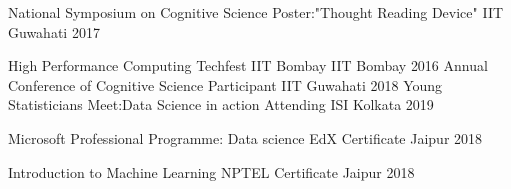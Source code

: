 
\vspace{-0.3cm}



\begin{cvhonors}


  \cvhonor
  {National Symposium on Cognitive Science} %
  {Poster:"Thought Reading Device"} %
  {IIT Guwahati} %
  {2017} %

  \cvhonor
  {High Performance Computing}
  {Techfest IIT Bombay}
  {IIT Bombay}
  {2016}
  \cvhonor
  {Annual Conference of Cognitive Science} %
  {Participant}
  {IIT Guwahati} %
  {2018} %
  \cvhonor
  {Young Statisticians Meet:Data Science in action} %
  {Attending} %
  {ISI Kolkata} %
  {2019} %

  \cvhonor
  {Microsoft Professional Programme: Data science}
  {EdX Certificate}
  {Jaipur}
  {2018}

  \cvhonor
  {Introduction to Machine Learning}
  {NPTEL Certificate}
  {Jaipur}
  {2018}




\end{cvhonors}

